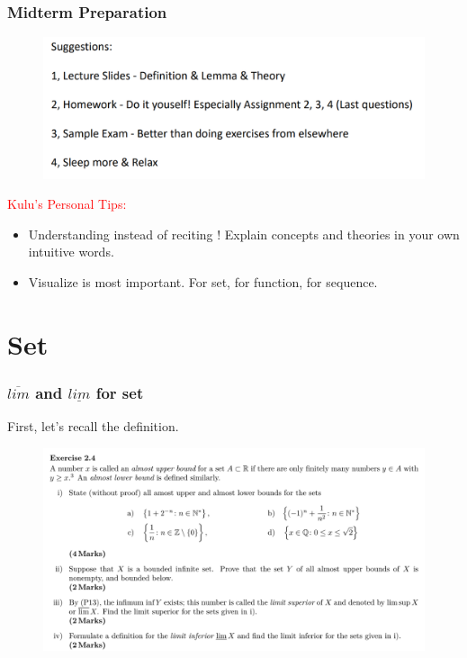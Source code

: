 \documentclass{beamer}
\begin{document}
\begin{frame}
    \frametitle{Midterm Preparation}
    \begin{figure}[htbp]
        \centering
        \includegraphics[width=12cm]{preparation.png}
    \end{figure}
    \textcolor{red}{Kulu's Personal Tips:}
    \begin{itemize}
        \item Understanding instead of reciting ! Explain concepts and theories in your own intuitive words.
        \item Visualize is most important. For set, for function, for sequence.
    \end{itemize}
\end{frame}

\section{Set}
\begin{frame}
    \frametitle{$\overline{lim}$ and $\underline{lim}$ for set}
    First, let's recall the definition.
    \begin{figure}[htbp]
        \centering
        \includegraphics[width=12cm]{definition.png}
    \end{figure}
\end{frame}
\end{document}
